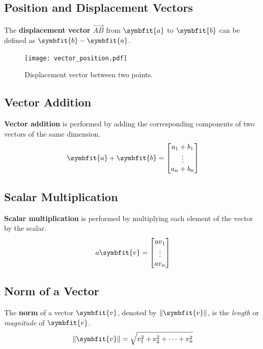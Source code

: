 \documentclass{article}
\begin{document}
	\subsection{Position and Displacement Vectors}
	\begin{definition}
		The \textbf{displacement vector} $\overrightarrow{AB}$ from $\symbfit{a}$ to $\symbfit{b}$ can be defined as $\symbfit{b}-\symbfit{a}$.
		\begin{figure}[H]
			\centering
			\texttt{[image: vector\_position.pdf]}
			\caption{Displacement vector between two points.}
		\end{figure}
	\end{definition}
	\subsection{Vector Addition}
		\begin{definition}
			\textbf{Vector addition} is performed by adding the corresponding components of two vectors of the same dimension.
			\begin{equation*}
				\symbfit{a} + \symbfit{b} =
				\mqty[
					a_1+b_1 \\
					\vdots \\
					a_n+b_n
				]
			\end{equation*}
		\end{definition}
	\subsection{Scalar Multiplication}
		\begin{definition}
			\textbf{Scalar multiplication} is performed by multiplying each element of the vector by the scalar. 
			\begin{equation*}
				a\symbfit{v} =
				\mqty[
					av_1 \\
					\vdots \\
					av_n
				]
			\end{equation*}
		\end{definition}
	\subsection{Norm of a Vector}
		\begin{definition}
			The \textbf{norm} of a vector $\symbfit{v}$, denoted by $\norm{\symbfit{v}}$, is the \textit{length} or \textit{magnitude} of $\symbfit{v}$.
			\begin{equation*}
				\norm{\symbfit{v}} = \sqrt{v_1^2 + v_2^2+\cdots+v_n^2}
			\end{equation*}
		\end{definition}
\end{document}
